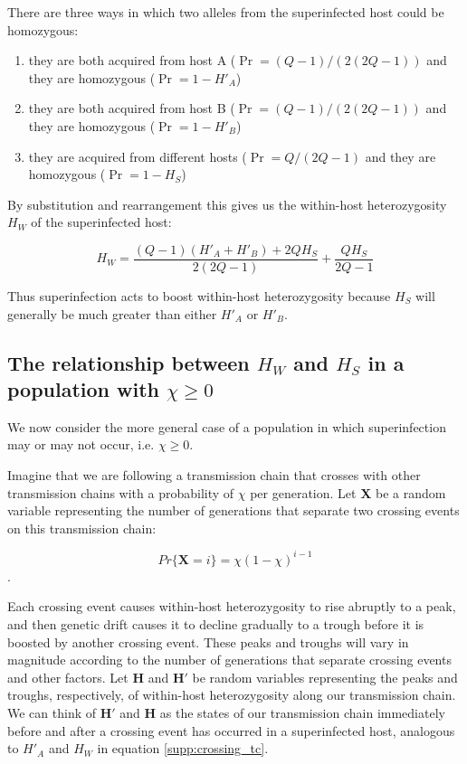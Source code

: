 \documentclass[_main.tex]{subfiles}
\begin{document}
There are three ways in which two alleles from the superinfected host could be homozygous:

\begin{enumerate}

\item they are both acquired from host A ($ \Pr = (Q-1)/(2(2Q-1))$ and they are homozygous ($ \Pr = 1- H'_A$)

\item they are both acquired from host B ($ \Pr = (Q-1)/(2(2Q-1))$ and they are homozygous ($ \Pr = 1- H'_B$)

\item they are acquired from different hosts ($ \Pr = Q / (2Q-1)$ and they are homozygous ($ \Pr = 1- H_S$)

\end{enumerate}

By substitution and rearrangement this gives us the within-host heterozygosity $H_W$ of the superinfected host:

\begin{equation}
H_W =
\frac{(Q-1) (H'_A + H'_B) + 2 Q H_S}{2(2Q-1)}
+ \frac{Q H_S}{2Q-1}
\label{supp:crossing_tc}
\end{equation}

Thus superinfection acts to boost within-host heterozygosity because $H_S$ will generally be much greater than either $H'_A$ or $H'_B$.  

\subsection{The relationship between \texorpdfstring{$H_W$ and $H_S$}{Hw and Hs} in a population with \texorpdfstring{$\chi \geq 0$}{chi>=0}}
\label{derive_hwhs_1}

We now consider the more general case of a population in which superinfection may or may not occur, i.e. $\chi \geq 0$.  

Imagine that we are following a transmission chain that crosses with other transmission chains with a probability of $\chi$ per generation.  Let \textbf{X} be a random variable representing the number of generations that separate two crossing events on this transmission chain: 

\begin{equation}
Pr \{ \textbf{X} = i \} = \chi (1- \chi)^{i-1}
\label{eq:supp_xprobdist}
\end{equation}.

Each crossing event causes within-host heterozygosity to rise abruptly to a peak, and then genetic drift causes it to decline gradually to a trough before it is boosted by another crossing event.  These peaks and troughs will vary in magnitude according to the number of generations that separate crossing events and other factors.  Let $\mathbf{H}$ and  $\mathbf{H'}$ be random variables representing the peaks and troughs, respectively, of within-host heterozygosity along our transmission chain.  We can think of $\mathbf{H'}$ and $\mathbf{H}$ as the states of our transmission chain immediately before and after a crossing event has occurred in a superinfected host, analogous to $H'_A$ and $H_W$ in equation \ref{supp:crossing_tc}.
\end{document}
